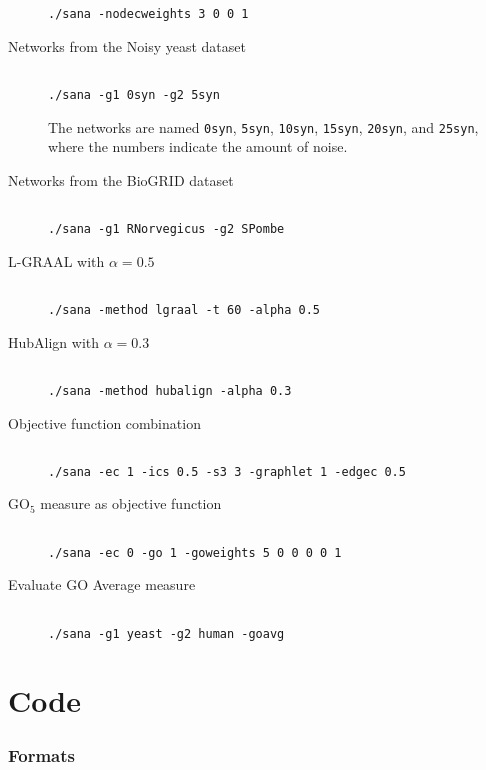 \documentclass[]{article}
\begin{document}
\begin{description}
\begin{verbatim}
./sana -nodecweights 3 0 0 1
\end{verbatim}
\item[Networks from the Noisy yeast dataset]
\begin{verbatim}

./sana -g1 0syn -g2 5syn
\end{verbatim}
The networks are named \texttt{0syn}, \texttt{5syn}, \texttt{10syn}, \texttt{15syn}, \texttt{20syn}, and \texttt{25syn}, where the numbers indicate the amount of noise.
\item[Networks from the BioGRID dataset]
\begin{verbatim}

./sana -g1 RNorvegicus -g2 SPombe
\end{verbatim}
\item[L-GRAAL with $\alpha=0.5$]
\begin{verbatim}

./sana -method lgraal -t 60 -alpha 0.5
\end{verbatim}
\item[HubAlign with $\alpha=0.3$]
\begin{verbatim}

./sana -method hubalign -alpha 0.3
\end{verbatim}
\item[Objective function combination]
\begin{verbatim}

./sana -ec 1 -ics 0.5 -s3 3 -graphlet 1 -edgec 0.5
\end{verbatim}
\item[$\mbox{GO}_5$ measure as objective function]
\begin{verbatim}

./sana -ec 0 -go 1 -goweights 5 0 0 0 0 1
\end{verbatim}
\item[Evaluate GO Average measure]
\begin{verbatim}

./sana -g1 yeast -g2 human -goavg
\end{verbatim}
\end{description}

\part{Code}

\section{Formats}\label{formats}
\end{document}

